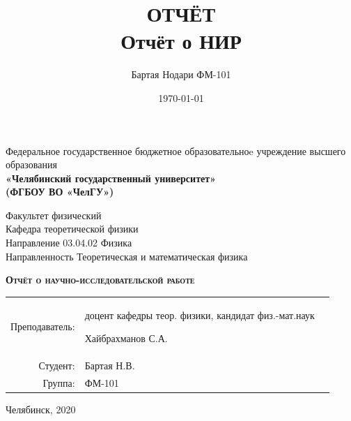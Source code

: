 \documentclass[a4paper]{article}
\author{Бартая Нодари ФМ-101}
\title{ОТЧЁТ\\ Отчёт о НИР}
\date{\today}
\begin{document}
\begin{titlepage}
	\begin{center}
		Федеральное государственное бюджетное образовательноe учреждение высшего образования \\
		\textbf{«Челябинский государственный университет» \\ (ФГБОУ ВО «ЧелГУ»)}
	\end{center}
	\begin{center}
		Факультет физический			\\
		Кафедра теоретической физики	\\
		Направление 03.04.02 Физика		\\
		Направленность Теоретическая и математическая физика
	\end{center}
	\vfill
	\begin{center}
		\textsc{\textbf{Отчёт о научно-исследовательской работе}}
	\end{center}
	\vfill
	\singlespace
	\begin{flushright}
		\begin{tabular}{r p{}l}
			Преподаватель:&	доцент кафедры теор. физики, кандидат физ.-мат.наук 
			
			Хайбрахманов С.А. \\[5pt]
			Студент:&	Бартая Н.В.		\\[5pt]
			Группа:& 	ФМ-101			\\
		\end{tabular}
	\end{flushright}
	\onehalfspacing
	\vfill
	\begin{center}
		Челябинск, 2020	
	\end{center}
\end{titlepage}
\end{document}

